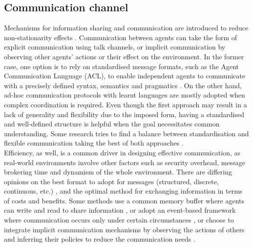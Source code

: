 \documentclass[a4paper,singleside,12pt]{report} %
\begin{document}
\subsection{Communication channel}\label{communication-channel}
Mechanisms for information sharing and communication are introduced to reduce non-stationarity effects \cite{Heider1944AnES, Rasouli2017AgreeingTC}. Communication between agents can take the form of explicit communication using talk channels, or implicit communication by observing other agents' actions or their effect on the environment. In the former case, one option is to rely on standardised message formats, such as the Agent Communication Language (ACL), to enable independent agents to communicate with a precisely defined syntax, semantics and pragmatics \cite{Poslad2007SpecifyingPF, Finin1994KQMLAA}. On the other hand, ad-hoc communication protocols with learnt languages are mostly adopted when complex coordination is required. Even though the first approach may result in a lack of generality and flexibility due to the imposed form, having a standardised and well-defined structure is helpful when the goal necessitates common understanding. Some research tries to find a balance between standardisation and flexible communication taking the best of both approaches \cite{Luncean2015CommunicationAI, Koes2004CommunicationEI}.\\
Efficiency, as well, is a common driver in designing effective communication, as real-world environments involve other factors such as security overhead, message brokering time and dynamism of the whole environment. There are differing opinions on the best format to adopt for messages (structured, discrete, continuous, etc.) \cite{Lowe2017MultiAgentAF, Koes2004CommunicationEI, Li2021LearningED, Sukhbaatar2016LearningMC}, and the optimal method for exchanging information in terms of costs and benefits. Some methods use a common memory buffer where agents can write and read to share information \cite{Pesce2019ImprovingCI}, or adopt an event-based framework where communication occurs only under certain circumstances \cite{Hu2021EventTriggeredCN}, or choose to integrate implicit communication mechanisms by observing the actions of others and inferring their policies to reduce the communication needs \cite{Ding2020LearningII}.\\
\end{document}
